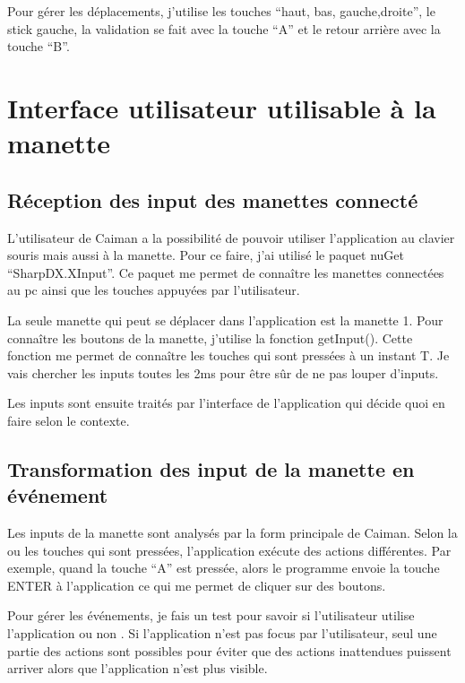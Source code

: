 \documentclass[a4paper,12pt,french]{sphinxmanual}
\begin{document}
\sphinxAtStartPar
Pour gérer les déplacements, j’utilise les touches “haut, bas, gauche,droite”, le stick gauche, la validation se fait avec la touche “A” et le retour arrière avec la touche “B”.


\chapter{Interface utilisateur utilisable à la manette}
\label{\detokenize{fonctionnelleInterface:interface-utilisateur-utilisable-a-la-manette}}\label{\detokenize{fonctionnelleInterface::doc}}

\section{Réception des input des manettes connecté}
\label{\detokenize{fonctionnelleInterface:reception-des-input-des-manettes-connecte}}
\sphinxAtStartPar
L’utilisateur de Caiman a la possibilité de pouvoir utiliser l’application au clavier souris mais aussi à la manette. Pour ce faire, j’ai utilisé le paquet nuGet “SharpDX.XInput”. Ce paquet me permet de connaître les manettes connectées au pc ainsi que les touches appuyées par l’utilisateur.

\sphinxAtStartPar
La seule manette qui peut se déplacer dans l’application est la manette 1. Pour connaître les boutons de la manette, j’utilise la fonction getInput(). Cette fonction me permet de connaître les touches qui sont pressées à un instant T.  Je vais chercher les inputs toutes les 2ms pour être sûr de ne pas louper d’inputs.

\sphinxAtStartPar
Les inputs sont ensuite traités par l’interface de l’application qui décide quoi en faire selon le contexte.


\section{Transformation des input de la manette en événement}
\label{\detokenize{fonctionnelleInterface:transformation-des-input-de-la-manette-en-evenement}}
\sphinxAtStartPar
Les inputs de la manette sont analysés par la form principale de Caiman. Selon la ou les touches qui sont pressées, l’application exécute des actions différentes. Par exemple, quand la touche “A” est pressée, alors le programme envoie la touche ENTER à l’application ce qui me permet de cliquer sur des boutons.

\sphinxAtStartPar
Pour gérer les événements, je fais un test pour savoir si l’utilisateur utilise l’application ou non . Si l’application n’est pas focus par l’utilisateur, seul une partie des actions sont possibles pour éviter que des actions inattendues puissent arriver alors que l’application n’est plus visible.
\end{document}
